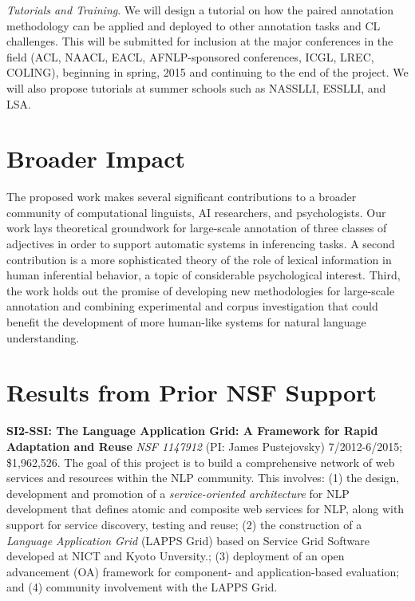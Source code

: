 \documentclass[10pt]{article}
\newcommand{\miniskip}{\vspace*{1mm}}
\begin{document}
{\it Tutorials and Training}.
We will design a tutorial on how the paired annotation methodology can be applied and deployed to other annotation tasks and CL challenges. This will be submitted for inclusion at the major conferences in the field (ACL, NAACL, EACL, AFNLP-sponsored conferences, ICGL, LREC, COLING), beginning in spring, 2015 and continuing to the end of the project. We will also propose tutorials at summer schools such as NASSLLI, ESSLLI, and LSA. 

\vspace {-5mm}
\section{Broader Impact}

\vspace {-3mm}
 
The proposed work  makes several significant contributions to a broader community of computational linguists, AI researchers, and psychologists. 
Our work lays theoretical groundwork for large-scale annotation of three classes of adjectives in order to support automatic systems in inferencing tasks. 
A second contribution is a more sophisticated theory of the role of lexical information in human inferential behavior, a topic of considerable psychological interest.
Third, the work holds out the promise of developing new methodologies for large-scale annotation and combining experimental and corpus investigation that could benefit the development of more human-like systems for natural language understanding.


\vspace {-5mm}
\section{Results from Prior NSF Support}

\vspace {-3mm}

\noindent
 {\bf SI2-SSI: The Language Application Grid: A Framework for Rapid Adaptation and Reuse} 
{\it NSF 1147912} (PI: James Pustejovsky) 7/2012-6/2015; \$1,962,526.
The goal of this  project is to  build  a comprehensive network of web services and resources within the NLP community. This involves:
(1) the design, development  and promotion of a {\it service-oriented architecture} for NLP development that defines atomic and composite web services for NLP, along with support for service discovery, testing and reuse; (2)  the construction of a {\it Language Application Grid} (LAPPS Grid) based on Service Grid Software developed at NICT and Kyoto Unversity.; (3)  deployment of an open advancement (OA) framework for
component- and application-based evaluation; and  (4)   community involvement with the LAPPS Grid.  
\end{document}
